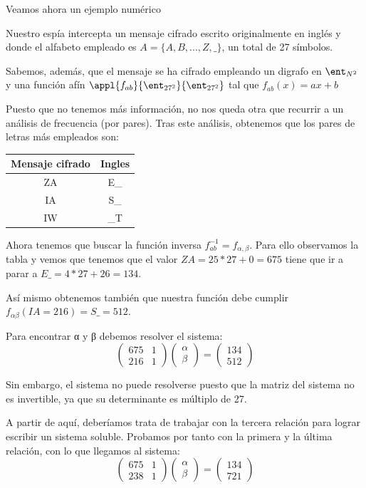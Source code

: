 Veamos ahora un ejemplo numérico
\begin{example}
Nuestro espía intercepta un mensaje cifrado escrito originalmente en inglés y donde el alfabeto empleado es $A=\{A,B,...,Z,\_\}$, un total de 27 símbolos.

Sabemos, además, que el mensaje se ha cifrado empleando un digrafo en $\ent_{N^2}$ y una función afín $\appl{f_{ab}}{\ent_{27^2}}{\ent_{27^2}}$ tal que $f_{ab}(x)=ax+b$

Puesto que no tenemos más información, no nos queda otra que recurrir a un análisis de frecuencia (por pares). Tras este análisis, obtenemos que los pares de letras más empleados son:
\begin{center}
\begin{tabular}{| c | c |}
\hline
\textbf{Mensaje cifrado} & \textbf{Ingles} \\
\hline
ZA & E\_\\
\hline
IA & S\_\\
\hline
IW & \_T \\
\hline
\end{tabular}
\end{center}

Ahora tenemos que buscar la función inversa $f^{-1}_{ab} = f_{α,β}$. Para ello observamos la tabla y vemos que tenemos que el valor $ZA = 25*27+0 = 675$ tiene que ir a parar a $E\_=4*27+26=134$.

Así mismo obtenemos también que nuestra función debe cumplir $f_{αβ}(IA = 216)=S\_ = 512$.

Para encontrar α y β debemos resolver el sistema:
\[\left( \begin{array}{cc}
675 & 1 \\
216 & 1  \end{array} \right)\left( \begin{array}{c}
α \\
β  \end{array} \right) = \left( \begin{array}{c}
134 \\
512  \end{array} \right)\]

Sin embargo, el sistema no puede resolverse puesto que la matriz del sistema no es invertible, ya que su determinante es múltiplo de 27.

A partir de aquí, deberíamos trata de trabajar con la tercera relación para lograr escribir un sistema soluble. Probamos por tanto con la primera y la última relación, con lo que llegamos al sistema:
\[\left( \begin{array}{cc}
675 & 1 \\
238 & 1  \end{array} \right)\left( \begin{array}{c}
α \\
β  \end{array} \right) = \left( \begin{array}{c}
134 \\
721  \end{array} \right)\]


\end{example}
